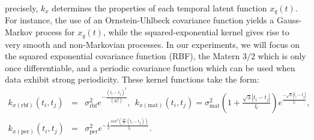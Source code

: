 \documentclass{article} %
\begin{document}
precisely, $k_x$ determines the properties of each temporal latent
function $x_q(t)$. For instance, the use of an Ornstein-Uhlbeck
covariance function yields a Gauss-Markov process for $x_q(t)$, while
the squared-exponential kernel gives rise to very smooth and
non-Markovian processes. %
In our experiments, we will focus on the squared exponential
covariance function (RBF), the Matern $3/2$ which is only once
differentiable, and a periodic covariance function
\cite{rasmussen-williams, MacKay98} which can be used when data
exhibit strong periodicity. These kernel functions take the form:
\begin{eqnarray}
k_{x(\text{rbf})} \left( \mathit{t_i, t_j} \right) 
& = & \sigma_{\text{rbf}}^2 e^{- \frac{\left( t_i - t_j \right)^2}{\left(
      2l_t^2 \right)}}, 
\ \ k_{x(\text{mat})} \left( t_i, t_j \right) =  
\sigma_{\text{mat}}^2 \left( 1 + \frac{\sqrt{3} |t_i - t_j|}{l_t} \right)
		e^{\frac{ - \sqrt{3} |t_i - t_j|}{l_t} }, \nonumber \\
k_{x(\text{per})} \left( \mathit{t_i, t_j} \right) 
& = & 
	\sigma_{\text{per}}^2 e^{-\frac{1}{2} \frac{sin^2 \left( \frac{2
                \pi}{T} \left( t_i - t_j \right) \right) }{l_t} }. 
 \label{eq:temporalkernels}
\end{eqnarray}
%  
%
%
%
\end{document}
